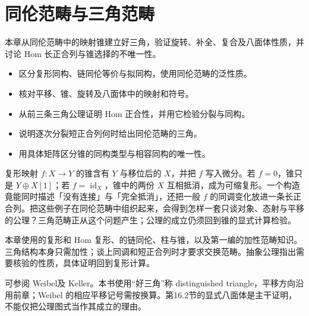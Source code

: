 
\chapter{同伦范畴与三角范畴}
\label{b4:ch:16}

\begin{chapterabstract}
本章从同伦范畴中的映射锥建立好三角，验证旋转、补全、复合及八面体性质，并讨论 Hom 长正合列与锥选择的不唯一性。
\end{chapterabstract}

\begin{learninggoals}
\begin{itemize}
\item 区分复形同构、链同伦等价与拟同构，使用同伦范畴的泛性质。
\item 核对平移、锥、旋转及八面体中的映射和符号。
\item 从前三条三角公理证明 Hom 正合性，并用它检验分裂与同构。
\item 说明逐次分裂短正合列何时给出同伦范畴的三角。
\item 用具体矩阵区分锥的同构类型与相容同构的唯一性。
\end{itemize}
\end{learninggoals}

复形映射 \(f:X\rightarrow Y\) 的锥含有 \(Y\) 与移位后的 \(X\)，并把 \(f\) 写入微分。若 \(f=0\)，锥只是 \(Y\oplus X[1]\)；若 \(f=\operatorname{id}_X\)，锥中的两份 \(X\) 互相抵消，成为可缩复形。一个构造竟能同时描述「没有连接」与「完全抵消」，还把一般 \(f\) 的同调变化放进一条长正合列。把这些例子在同伦范畴中组织起来，会得到怎样一套只谈对象、态射与平移的公理？三角范畴正从这个问题产生；公理的成立仍须回到锥的显式计算检验。

\ProseParagraphBreak
本章使用的复形和 Hom 复形、的链同伦、柱与锥，以及第一编的加性范畴知识。三角结构本身只需加性；谈上同调和短正合列时才要求交换范畴。抽象公理指出需要核验的性质，具体证明回到复形计算。

\ProseParagraphBreak
可参阅 Weibel\cite[Definitions 10.1.3 and 10.2.1; Proposition 10.2.4; Example 10.2.8]{Weibel1994HomologicalAlgebra}及 Keller\cite[Section 3.1]{Keller1998AbelianDerived}。本书使用“好三角”称 distinguished triangle，平移方向沿用前章；Weibel 的相应平移记号需按换算。第16.2节的显式八面体是主干证明，不能仅把公理图式当作其成立的理由。

